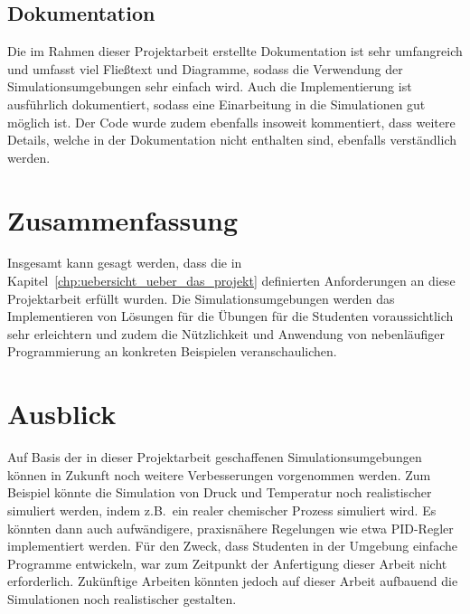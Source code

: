 \documentclass[oneside]{elaboration}
\begin{document}
\section{Dokumentation}
\label{sec:dokumentation}

Die im Rahmen dieser Projektarbeit erstellte Dokumentation ist sehr umfangreich
und umfasst viel Fließtext und Diagramme, sodass die Verwendung der
Simulationsumgebungen sehr einfach wird. Auch die Implementierung ist
ausführlich dokumentiert, sodass eine Einarbeitung in die Simulationen gut
möglich ist. Der Code wurde zudem ebenfalls insoweit kommentiert, dass weitere
Details, welche in der Dokumentation nicht enthalten sind, ebenfalls
verständlich werden.

\chapter{Zusammenfassung}
\label{chp:zusammenfassung}

Insgesamt kann gesagt werden, dass die in
Kapitel~\ref{chp:uebersicht_ueber_das_projekt} definierten Anforderungen an
diese Projektarbeit erfüllt wurden. Die Simulationsumgebungen werden das
Implementieren von Lösungen für die Übungen für die Studenten voraussichtlich
sehr erleichtern und zudem die Nützlichkeit und Anwendung von nebenläufiger
Programmierung an konkreten Beispielen veranschaulichen.

\chapter{Ausblick}
\label{chp:ausblick}

Auf Basis der in dieser Projektarbeit geschaffenen Simulationsumgebungen können
in Zukunft noch weitere Verbesserungen vorgenommen werden. Zum Beispiel könnte
die Simulation von Druck und Temperatur noch realistischer simuliert werden,
indem z.B.\ ein realer chemischer Prozess simuliert wird. Es könnten dann auch
aufwändigere, praxisnähere Regelungen wie etwa PID-Regler implementiert werden.
Für den Zweck, dass Studenten in der Umgebung einfache Programme entwickeln, war
zum Zeitpunkt der Anfertigung dieser Arbeit nicht erforderlich.  Zukünftige
Arbeiten könnten jedoch auf dieser Arbeit aufbauend die Simulationen noch
realistischer gestalten.


\clearpage
\end{document}
